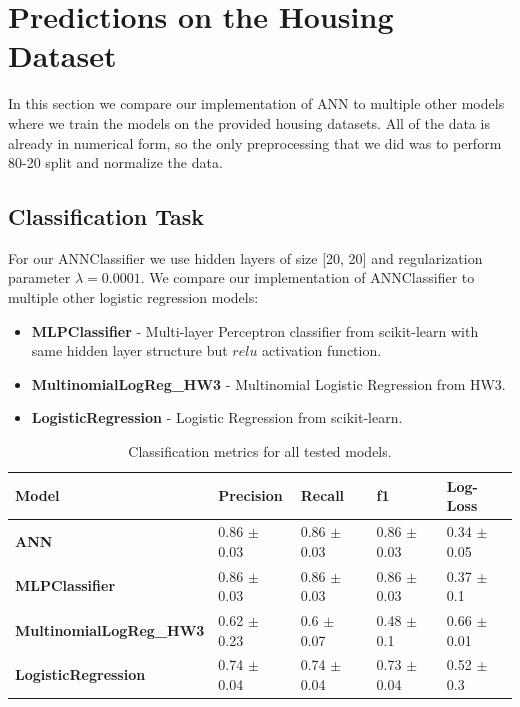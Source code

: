 \documentclass[9pt]{IEEEtran}
\begin{document}
\section{Predictions on the Housing Dataset}
In this section we compare our implementation of ANN to multiple other models where we train the models on the provided housing datasets.
All of the data is already in numerical form, so the only preprocessing that we did was to perform 80-20 split and normalize the data.

\subsection{Classification Task}
For our ANNClassifier we use hidden layers of size [20, 20] and regularization parameter $\lambda = 0.0001$.
We compare our implementation of ANNClassifier to multiple other logistic regression models:
\begin{itemize}
    \item \textbf{MLPClassifier} - Multi-layer Perceptron classifier from scikit-learn with same hidden layer structure but $relu$ activation function.
    \item \textbf{MultinomialLogReg\_HW3} - Multinomial Logistic Regression from HW3.
    \item \textbf{LogisticRegression} - Logistic Regression from scikit-learn.
\end{itemize}

\begin{table}[!ht]
    \centering
    \begin{tabular}{lllll}
        \textbf{Model} & \textbf{Precision} & \textbf{Recall} & \textbf{f1} & \textbf{Log-Loss} \\ \hline
        \textbf{ANN} & 0.86 $\pm$ 0.03 & 0.86 $\pm$  0.03 & 0.86 $\pm$ 0.03 & 0.34 $\pm$ 0.05 \\ 
        \textbf{MLPClassifier} & 0.86 $\pm$ 0.03 & 0.86 $\pm$ 0.03 & 0.86 $\pm$ 0.03 & 0.37 $\pm$ 0.1 \\ 
        \textbf{MultinomialLogReg\_HW3} & 0.62 $\pm$ 0.23 & 0.6  $\pm$ 0.07 & 0.48 $\pm$ 0.1 & 0.66 $\pm$ 0.01 \\ 
        \textbf{LogisticRegression} & 0.74 $\pm$ 0.04& 0.74 $\pm$ 0.04& 0.73 $\pm$ 0.04& 0.52 $\pm$ 0.3 \\ 
    \end{tabular}
    \caption{Classification metrics for all tested models.}
    \label{classification_scores}
\end{table}
\end{document}
